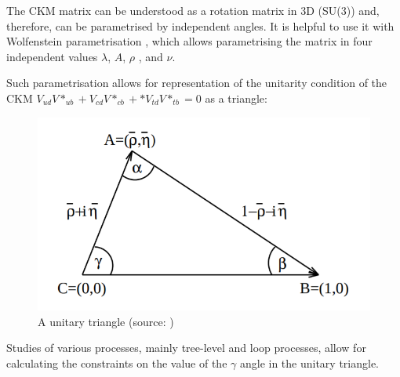 The CKM matrix can be understood as a rotation matrix in 3D (SU(3)) and, therefore, can be parametrised by independent angles.
It is helpful to use it with Wolfenstein parametrisation \cite{PhysRevLett.51.1945}, which allows parametrising the matrix in four independent values $\lambda$, $A$, $\rho$ , and $\nu$.

Such parametrisation allows for representation of the unitarity condition of the CKM  $V_{ud}V*_{ub} + V_{cd}V*_{cb}+ * V_{td}V*_{tb} = 0$ as a triangle:


\begin{figure}
  \centering
  \includegraphics[width=0.6\linewidth]{figures/chapter1/UnitaryTriangle.png}
  \caption{A unitary triangle (source: \cite{buras2002unitarity})}
  \label{fig:unitary_triangle}
\end{figure}

Studies of various processes, mainly tree-level and loop processes, allow for calculating the constraints on the value of the $\gamma$ angle in the unitary triangle.


